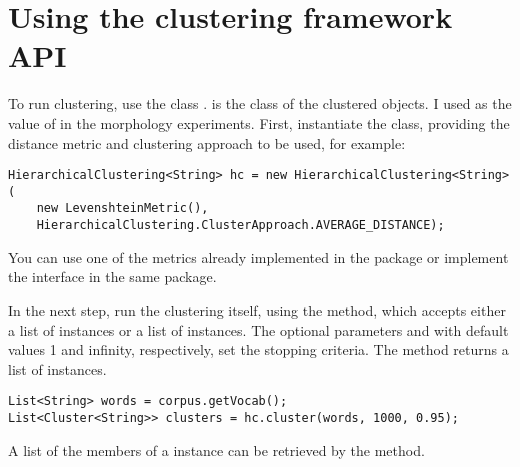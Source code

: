\section{Using the clustering framework API}\label{section:cf_api}

To run clustering, use the class .  is the class of the clustered objects. I used  as the value of  in the morphology experiments. First, instantiate the class, providing the distance metric and clustering approach to be used, for example:
\begin{small}\begin{verbatim}
HierarchicalClustering<String> hc = new HierarchicalClustering<String>(
    new LevenshteinMetric(),
    HierarchicalClustering.ClusterApproach.AVERAGE_DISTANCE);
\end{verbatim}
\end{small}
You can use one of the metrics already implemented in the  package or implement the  interface in the same package.

In the next step, run the clustering itself, using the  method, which accepts either a list of  instances or a list of  instances. The optional parameters  and  with default values 1 and infinity, respectively, set the stopping criteria. The method returns a list of  instances.
\begin{small}\begin{verbatim}
List<String> words = corpus.getVocab();
List<Cluster<String>> clusters = hc.cluster(words, 1000, 0.95);
\end{verbatim}
\end{small}
A list of the members of a  instance can be retrieved by the  method.
